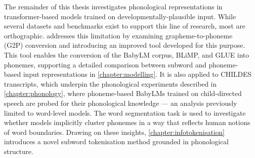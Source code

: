 The remainder of this thesis investigates phonological representations in transformer-based models trained on developmentally-plausible input. While several datasets and benchmarks exist to support this line of research, most are orthographic.  addresses this limitation by examining grapheme-to-phoneme (G2P) conversion and introducing an improved tool developed for this purpose. This tool enables the conversion of the BabyLM corpus, BLiMP, and GLUE into phonemes, supporting a detailed comparison between subword and phoneme-based input representations in \cref{chapter:modelling}. It is also applied to CHILDES transcripts, which underpin the phonological experiments described in \cref{chapter:phonology}, where phoneme-based BabyLMs trained on child-directed speech are probed for their phonological knowledge --- an analysis previously limited to word-level models. The word segmentation task is used to investigate whether models implicitly cluster phonemes in a way that reflects human notions of word boundaries. Drawing on these insights, \cref{chapter:infotokenisation} introduces a novel subword tokenisation method grounded in phonological structure.


